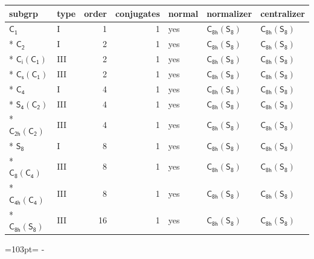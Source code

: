 \documentclass[10pt,a4paper]{article}
\newcommand{\needspace}[1]{\par\penalty-100\begingroup\dimen0=#1\relax\dimen2=\pagegoal
  \advance\dimen2-\pagetotal\ifdim\dimen0>\dimen2\relax\ifdim\dimen2>0pt\vfil\break\fi\fi
  \endgroup}
\numberwithin{equation}{section}
\newcommand{\grp}[1]{\mathsf{#1}}
\begin{document}
{\small\begin{longtable}{@{}llrrlll@{}}\toprule
subgrp & type & order & conjugates & normal & normalizer & centralizer\\\midrule\endhead
\bottomrule\endfoot\endlastfoot
\href{../../../rotation/data/pdf/C1.pdf}{$\grp{C_{1}}$} & I & 1 & 1 & yes & \href{C8h-S8.pdf}{$\grp{C_{8h}}(\grp{S_{8}})$} & \href{C8h-S8.pdf}{$\grp{C_{8h}}(\grp{S_{8}})$}\\*
\href{../../../rotation/data/pdf/C2.pdf}{$\grp{C_{2}}$} & I & 2 & 1 & yes & \href{C8h-S8.pdf}{$\grp{C_{8h}}(\grp{S_{8}})$} & \href{C8h-S8.pdf}{$\grp{C_{8h}}(\grp{S_{8}})$}\\*
\href{S2-C1.pdf}{$\grp{C_{i}}(\grp{C_{1}})$} & III & 2 & 1 & yes & \href{C8h-S8.pdf}{$\grp{C_{8h}}(\grp{S_{8}})$} & \href{C8h-S8.pdf}{$\grp{C_{8h}}(\grp{S_{8}})$}\\*
\href{C1v-C1.pdf}{$\grp{C_{s}}(\grp{C_{1}})$} & III & 2 & 1 & yes & \href{C8h-S8.pdf}{$\grp{C_{8h}}(\grp{S_{8}})$} & \href{C8h-S8.pdf}{$\grp{C_{8h}}(\grp{S_{8}})$}\\*
\href{../../../rotation/data/pdf/C4.pdf}{$\grp{C_{4}}$} & I & 4 & 1 & yes & \href{C8h-S8.pdf}{$\grp{C_{8h}}(\grp{S_{8}})$} & \href{C8h-S8.pdf}{$\grp{C_{8h}}(\grp{S_{8}})$}\\*
\href{S4-C2.pdf}{$\grp{S_{4}}(\grp{C_{2}})$} & III & 4 & 1 & yes & \href{C8h-S8.pdf}{$\grp{C_{8h}}(\grp{S_{8}})$} & \href{C8h-S8.pdf}{$\grp{C_{8h}}(\grp{S_{8}})$}\\*
\href{C2h-C2.pdf}{$\grp{C_{2h}}(\grp{C_{2}})$} & III & 4 & 1 & yes & \href{C8h-S8.pdf}{$\grp{C_{8h}}(\grp{S_{8}})$} & \href{C8h-S8.pdf}{$\grp{C_{8h}}(\grp{S_{8}})$}\\*
\href{../../../rotation/data/pdf/S8.pdf}{$\grp{S_{8}}$} & I & 8 & 1 & yes & \href{C8h-S8.pdf}{$\grp{C_{8h}}(\grp{S_{8}})$} & \href{C8h-S8.pdf}{$\grp{C_{8h}}(\grp{S_{8}})$}\\*
\href{C8-C4.pdf}{$\grp{C_{8}}(\grp{C_{4}})$} & III & 8 & 1 & yes & \href{C8h-S8.pdf}{$\grp{C_{8h}}(\grp{S_{8}})$} & \href{C8h-S8.pdf}{$\grp{C_{8h}}(\grp{S_{8}})$}\\*
\href{C4h-C4.pdf}{$\grp{C_{4h}}(\grp{C_{4}})$} & III & 8 & 1 & yes & \href{C8h-S8.pdf}{$\grp{C_{8h}}(\grp{S_{8}})$} & \href{C8h-S8.pdf}{$\grp{C_{8h}}(\grp{S_{8}})$}\\*
\href{C8h-S8.pdf}{$\grp{C_{8h}}(\grp{S_{8}})$} & III & 16 & 1 & yes & \href{C8h-S8.pdf}{$\grp{C_{8h}}(\grp{S_{8}})$} & \href{C8h-S8.pdf}{$\grp{C_{8h}}(\grp{S_{8}})$}\\
\bottomrule\end{longtable}}
\needspace{103pt}
\end{document}
